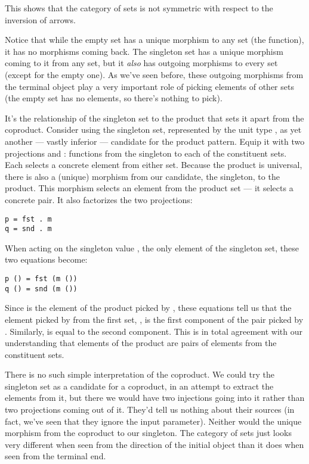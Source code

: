 This shows that the category of sets is not symmetric with respect to
the inversion of arrows.

Notice that while the empty set has a unique morphism to any set (the
 function), it has no morphisms coming back. The
singleton set has a unique morphism coming to it from any set, but it
\emph{also} has outgoing morphisms to every set (except for the empty
one). As we've seen before, these outgoing morphisms from the terminal
object play a very important role of picking elements of other sets (the
empty set has no elements, so there's nothing to pick).

It's the relationship of the singleton set to the product that sets it
apart from the coproduct. Consider using the singleton set, represented
by the unit type \code{()}, as yet another --- vastly inferior ---
candidate for the product pattern. Equip it with two projections
 and : functions from the singleton to each of the
constituent sets. Each selects a concrete element from either set.
Because the product is universal, there is also a (unique) morphism
 from our candidate, the singleton, to the product. This
morphism selects an element from the product set --- it selects a
concrete pair. It also factorizes the two projections:

\begin{Verbatim}
p = fst . m
q = snd . m
\end{Verbatim}
When acting on the singleton value \code{()}, the only element of the
singleton set, these two equations become:

\begin{Verbatim}
p () = fst (m ())
q () = snd (m ())
\end{Verbatim}
Since  is the element of the product picked by ,
these equations tell us that the element picked by  from the
first set, , is the first component of the pair picked by
. Similarly,  is equal to the second component.
This is in total agreement with our understanding that elements of the
product are pairs of elements from the constituent sets.

There is no such simple interpretation of the coproduct. We could try
the singleton set as a candidate for a coproduct, in an attempt to
extract the elements from it, but there we would have two injections
going into it rather than two projections coming out of it. They'd tell
us nothing about their sources (in fact, we've seen that they ignore the
input parameter). Neither would the unique morphism from the coproduct
to our singleton. The category of sets just looks very different when
seen from the direction of the initial object than it does when seen
from the terminal end.

